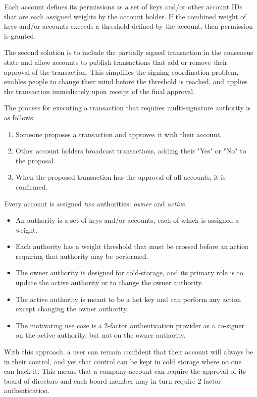 Each account defines its permissions as a set of keys and/or other account IDs
that are each assigned weights by the account holder. If the combined weight of
keys and/or accounts exceeds a threshold defined by the account, then
permission is granted.

The second solution is to include the partially signed transaction in the
consensus state and allow accounts to publish transactions that add or remove
their approval of the transaction. This simplifies the signing coordination
problem, enables people to change their mind before the threshold is reached,
and applies the transaction immediately upon receipt of the final approval.

The process for executing a transaction that requires multi-signature authority
is as follows:
\begin{enumerate}
 \item Someone proposes a transaction and approves it with their account.
 \item Other account holders broadcast transactions, adding their "Yes" or "No"
       to the proposal.
 \item When the proposed transaction has the approval of all accounts, it is
       confirmed.
\end{enumerate}

Every account is assigned \emph{two} authorities: \emph{owner} and \emph{active}.

\begin{itemize}
\item An authority is a set of keys and/or accounts, each of which is
      assigned a weight.
\item Each authority has a weight threshold that must be crossed before an
      action requiring that authority may be performed.
\item The owner authority is designed for cold-storage, and its primary role
      is to update the active authority or to change the owner authority.
\item The active authority is meant to be a hot key and can perform any
      action except changing the owner authority.
\item The motivating use case is a 2-factor authentication provider as a
      co-signer on the active authority, but not on the owner authority.
\end{itemize}

With this approach, a user can remain confident that their account will always
be in their control, and yet that control can be kept in cold storage where no
one can hack it. This means that a company account can require the approval of
its board of directors and each board member may in turn require 2 factor
authentication.

